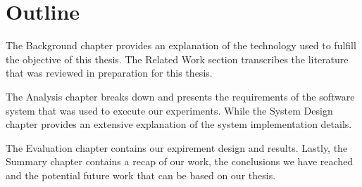 \section{Outline}

The Background chapter provides an explanation of the technology used to fulfill the objective of this thesis. The Related Work section transcribes the literature that was reviewed in preparation for this thesis.

The Analysis chapter breaks down and presents the requirements of the software system that was used to execute our experiments. While the System Design chapter provides an extensive explanation of the system implementation details.

The Evaluation chapter contains our expirement design and results. Lastly, the Summary chapter contains a recap of our work, the conclusions we have reached and the potential future work that can be based on our thesis.